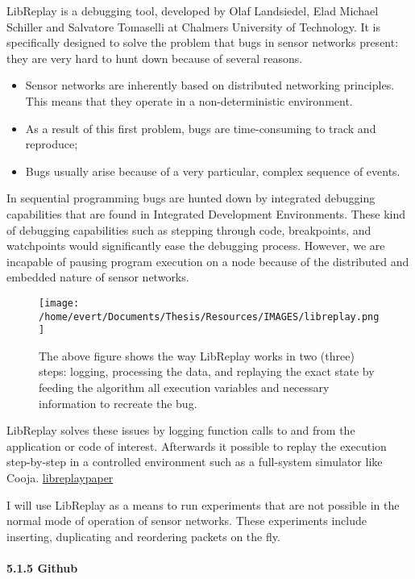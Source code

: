 LibReplay is a debugging tool, developed by Olaf Landsiedel, Elad
Michael Schiller and Salvatore Tomaselli at Chalmers University of
Technology. It is specifically designed to solve the problem that bugs
in sensor networks present: they are very hard to hunt down because of
several reasons.

\begin{itemize}
\itemsep1pt\parskip0pt
\item
  Sensor networks are inherently based on distributed networking
  principles. This means that they operate in a non-deterministic
  environment.
\item
  As a result of this first problem, bugs are time-consuming to track
  and reproduce;
\item
  Bugs usually arise because of a very particular, complex sequence of
  events.
\end{itemize}

In sequential programming bugs are hunted down by integrated debugging
capabilities that are found in Integrated Development Environments.
These kind of debugging capabilities such as stepping through code,
breakpoints, and watchpoints would significantly ease the debugging
process. However, we are incapable of pausing program execution on a
node because of the distributed and embedded nature of sensor networks.

\begin{figure}[htbp]
\centering
\texttt{[image: /home/evert/Documents/Thesis/Resources/IMAGES/libreplay.png]}
\caption{The above figure shows the way LibReplay works in two (three)
steps: logging, processing the data, and replaying the exact state by
feeding the algorithm all execution variables and necessary information
to recreate the bug.}
\end{figure}

LibReplay solves these issues by logging function calls to and from the
application or code of interest. Afterwards it possible to replay the
execution step-by-step in a controlled environment such as a full-system
simulator like Cooja.
\href{http://www.cse.chalmers.se/~olafl/papers/2015-02-ewsn-landsiedel-libreplay.pdf}{libreplaypaper}

I will use LibReplay as a means to run experiments that are not possible
in the normal mode of operation of sensor networks. These experiments
include inserting, duplicating and reordering packets on the fly.

\paragraph{5.1.5 Github\\\\}\label{github}

